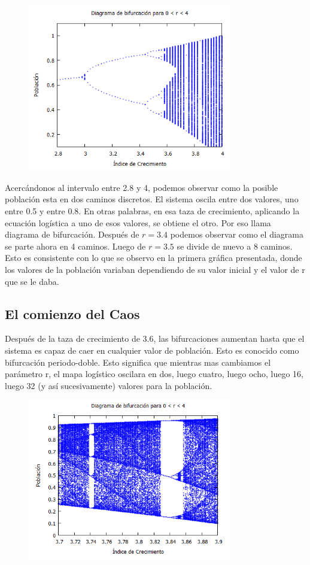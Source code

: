 \documentclass[12pt]{article}
\begin{document}
\begin{figure}[h!]
    \centering
\includegraphics[width=3.5in]{Bif2.png}
\end{figure}

Acercándonos al intervalo entre 2.8 y 4, podemos observar como la posible población esta en dos caminos discretos. El sistema oscila entre dos valores, uno entre 0.5 y entre 0.8. En otras palabras, en esa taza de crecimiento, aplicando la ecuación logística a uno de esos valores, se obtiene el otro. Por eso llama diagrama de bifurcación. Después de $r=3.4$ podemos observar como el diagrama se parte ahora en 4 caminos. Luego de $r=3.5$ se divide de nuevo a 8 caminos. Esto es consistente con lo que se observo en la primera gráfica presentada, donde los valores de la población variaban dependiendo de su valor inicial y el valor de r que se le daba.

\subsection{El comienzo del Caos}
Después de la taza de crecimiento de 3.6, las bifurcaciones aumentan hasta que el sistema es capaz de caer en cualquier valor de población. Esto es conocido como bifurcación periodo-doble. Esto significa que mientras mas cambiamos el parámetro r, el mapa logístico oscilara en dos, luego cuatro, luego ocho, luego 16, luego 32 (y así sucesivamente)  valores para la población.

\begin{figure}[h!]
    \centering
\includegraphics[width=3.5in]{Bif3.png}
\end{figure}
\end{document}
